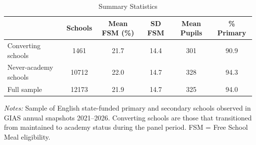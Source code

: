 \begin{table}[htbp]
\centering
\caption{Summary Statistics}
\label{tab:summary}
\begin{tabular}{lccccc}
\toprule
 & Schools & Mean FSM (\%) & SD FSM & Mean Pupils & \% Primary \\
\midrule
Converting schools & 1461 & 21.7 & 14.4 & 301 & 90.9 \\
Never-academy schools & 10712 & 22.0 & 14.7 & 328 & 94.3 \\
\midrule
Full sample & 12173 & 21.9 & 14.7 & 325 & 94.0 \\
\bottomrule
\end{tabular}
\begin{tablenotes}
\item \textit{Notes:} Sample of English state-funded primary and secondary schools observed in GIAS annual snapshots 2021--2026. Converting schools are those that transitioned from maintained to academy status during the panel period. FSM = Free School Meal eligibility.
\end{tablenotes}
\end{table}

